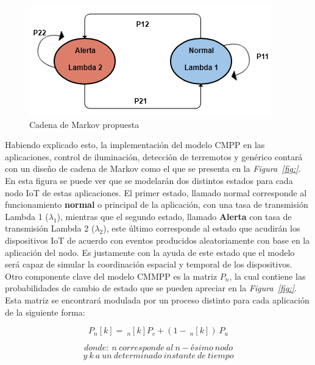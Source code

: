 \begin{figure}[th]
\centering
\includegraphics[scale=1]{Figures/Cadena de Markov propuesta}
\decoRule
\caption[Cadena de Markov propuesta]{Cadena de Markov propuesta}
\label{fig:CMMPPpropuesta}
\end{figure}

Habiendo explicado esto, la implementación del modelo CMPP en las aplicaciones, control de iluminación, detección de terremotos y genérico contará con un diseño de cadena de Markov como el que se presenta en la \textit{Figura~\ref{fig:}. }En esta figura se puede ver que se modelarán dos distintos estados para cada nodo IoT de estas aplicaciones. El primer estado, llamado normal corresponde al funcionamiento \textbf{normal} o principal de la aplicación, con una tasa de transmisión Lambda 1 (${\lambda }_1$), mientras que el segundo estado, llamado \textbf{Alerta} con tasa de transmisión Lambda 2 (${\lambda }_2$), este último corresponde al estado que acudirán los dispositivos IoT de acuerdo con eventos producidos aleatoriamente con base en la aplicación del nodo. Es justamente con la ayuda de este estado que el modelo será capaz de simular la coordinación espacial y temporal de los dispositivos. Otro componente clave del modelo CMMPP es la matriz $P_n$, la cual contiene las probabilidades de cambio de estado que se pueden apreciar en la \textit{Figura~\ref{fig:}}. Esta matriz se encontrará modulada por un proceso distinto para cada aplicación de la siguiente forma:

\begin{equation}
P_n\left[k\right]=\ _n\left[k\right] P_c+\left(1-\ _n\left[k\right]\right)\ P_u 
\label{eqn:Pn}
\end{equation}

\[donde:\ n\ corresponde\ al\ n-\textrm{é}simo\ nodo\] 
\[y\ k\ a\ un\ determinado\ instante\ de\ tiempo\] 

